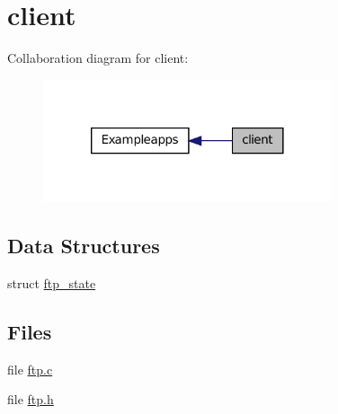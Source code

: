 \hypertarget{group__ftp}{
\section{client}
\label{group__ftp}
}


Collaboration diagram for client:
\nopagebreak
\begin{figure}[H]
\begin{center}
\leavevmode
\includegraphics[width=240pt]{group__ftp}
\end{center}
\end{figure}


\subsection*{Data Structures}
\begin{DoxyCompactItemize}
\item 
struct \hyperlink{structftp__state}{ftp\_\-state}
\end{DoxyCompactItemize}
\subsection*{Files}
\begin{DoxyCompactItemize}
\item 
file \hyperlink{ftp_8c}{ftp.c}
\item 
file \hyperlink{ftp_8h}{ftp.h}
\end{DoxyCompactItemize}
